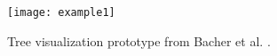 \begin{figure}[ht]
  \texttt{[image: example1]}
  \caption[Visualization example]{Tree visualization prototype from Bacher et al. \cite{bacher_using_2016}.}
  \label{fig:example1}
  \centering
\end{figure}